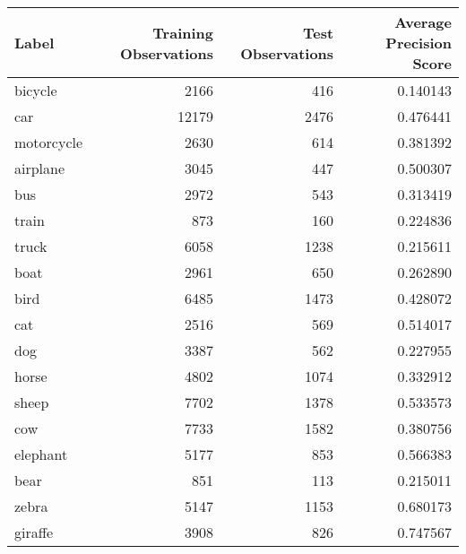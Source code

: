 \begin{tabular}{lrrr}
\toprule
      Label &  Training Observations &  Test Observations &  Average Precision Score \\
\midrule
    bicycle &                   2166 &                416 &                 0.140143 \\
        car &                  12179 &               2476 &                 0.476441 \\
 motorcycle &                   2630 &                614 &                 0.381392 \\
   airplane &                   3045 &                447 &                 0.500307 \\
        bus &                   2972 &                543 &                 0.313419 \\
      train &                    873 &                160 &                 0.224836 \\
      truck &                   6058 &               1238 &                 0.215611 \\
       boat &                   2961 &                650 &                 0.262890 \\
       bird &                   6485 &               1473 &                 0.428072 \\
        cat &                   2516 &                569 &                 0.514017 \\
        dog &                   3387 &                562 &                 0.227955 \\
      horse &                   4802 &               1074 &                 0.332912 \\
      sheep &                   7702 &               1378 &                 0.533573 \\
        cow &                   7733 &               1582 &                 0.380756 \\
   elephant &                   5177 &                853 &                 0.566383 \\
       bear &                    851 &                113 &                 0.215011 \\
      zebra &                   5147 &               1153 &                 0.680173 \\
    giraffe &                   3908 &                826 &                 0.747567 \\
\bottomrule
\end{tabular}
